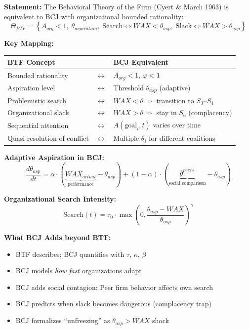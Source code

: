 \begin{tcolorbox}[colback=green!5!white, colframe=green!75!black,
    title=Theorem BCJ-T31: Behavioral Theory of the Firm as Special Case]
\textbf{Statement:} The Behavioral Theory of the Firm (Cyert \& March 1963) is equivalent to BCJ with organizational bounded rationality:
\begin{equation}
\Theta_{BTF} = \left\{A_{org} < 1, \; \theta_{aspiration}, \; \text{Search} \Leftrightarrow WAX < \theta_{asp}, \; \text{Slack} \Leftrightarrow WAX > \theta_{asp}\right\}
\end{equation}

\textbf{Key Mapping:}
\begin{center}
\begin{tabular}{lcl}
\toprule
\textbf{BTF Concept} & & \textbf{BCJ Equivalent} \\
\midrule
Bounded rationality & $\leftrightarrow$ & $A_{org} < 1$, $\varphi < 1$ \\
Aspiration level & $\leftrightarrow$ & Threshold $\theta_{asp}$ (adaptive) \\
Problemistic search & $\leftrightarrow$ & $WAX < \theta \Rightarrow$ transition to $S_3$--$S_4$ \\
Organizational slack & $\leftrightarrow$ & $WAX > \theta \Rightarrow$ stay in $S_6$ (complacency) \\
Sequential attention & $\leftrightarrow$ & $A(\text{goal}_i, t)$ varies over time \\
Quasi-resolution of conflict & $\leftrightarrow$ & Multiple $\theta_i$ for different coalitions \\
\bottomrule
\end{tabular}
\end{center}

\textbf{Adaptive Aspiration in BCJ:}
\begin{equation}
\frac{d\theta_{asp}}{dt} = \alpha \cdot (\underbrace{WAX_{actual}}_{\text{performance}} - \theta_{asp}) + (1-\alpha) \cdot (\underbrace{\bar{\theta}^{peers}}_{\text{social comparison}} - \theta_{asp})
\end{equation}

\textbf{Organizational Search Intensity:}
\begin{equation}
\text{Search}(t) = \tau_0 \cdot \max\left(0, \frac{\theta_{asp} - WAX}{\theta_{asp}}\right)^{\gamma}
\end{equation}

\textbf{What BCJ Adds beyond BTF:}
\begin{itemize}[nosep]
\item BTF describes; BCJ quantifies with $\tau$, $\kappa$, $\beta$
\item BCJ models \textit{how fast} organizations adapt
\item BCJ adds social contagion: Peer firm behavior affects own search
\item BCJ predicts when slack becomes dangerous (complacency trap)
\item BCJ formalizes ``unfreezing'' as $\theta_{asp} > WAX$ shock
\end{itemize}


\end{tcolorbox}
